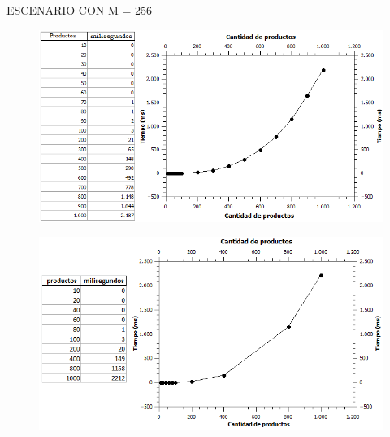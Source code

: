 \documentclass[10pt,a4paper]{article}
\begin{document}
\indent ESCENARIO CON M = 256
	\begin{figure}[h]
		\begin{center}
		   \includegraphics[scale=0.50]{experimentos/random/graficos/256.png}
		\end{center}
	\end{figure}
	\begin{figure}[h]
		\begin{center}
		   \includegraphics[scale=0.50]{sincota/graficos/256.png}
		\end{center}
	\end{figure} \\
\end{document}
